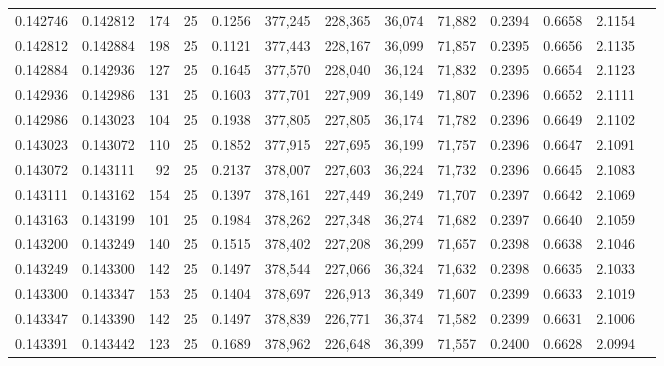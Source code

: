 \begin{tabular}{rrrrrrrrrrrrr}
0.142746 & 0.142812 &   174 &  25 &                                     0.1256 & 377,245 & 228,365 &  36,074 &  71,882 & 0.2394 & 0.6658 & 2.1154 \\
0.142812 & 0.142884 &   198 &  25 &                                     0.1121 & 377,443 & 228,167 &  36,099 &  71,857 & 0.2395 & 0.6656 & 2.1135 \\
0.142884 & 0.142936 &   127 &  25 &                                     0.1645 & 377,570 & 228,040 &  36,124 &  71,832 & 0.2395 & 0.6654 & 2.1123 \\
0.142936 & 0.142986 &   131 &  25 &                                     0.1603 & 377,701 & 227,909 &  36,149 &  71,807 & 0.2396 & 0.6652 & 2.1111 \\
0.142986 & 0.143023 &   104 &  25 &                                     0.1938 & 377,805 & 227,805 &  36,174 &  71,782 & 0.2396 & 0.6649 & 2.1102 \\
0.143023 & 0.143072 &   110 &  25 &                                     0.1852 & 377,915 & 227,695 &  36,199 &  71,757 & 0.2396 & 0.6647 & 2.1091 \\
0.143072 & 0.143111 &    92 &  25 &                                     0.2137 & 378,007 & 227,603 &  36,224 &  71,732 & 0.2396 & 0.6645 & 2.1083 \\
0.143111 & 0.143162 &   154 &  25 &                                     0.1397 & 378,161 & 227,449 &  36,249 &  71,707 & 0.2397 & 0.6642 & 2.1069 \\
0.143163 & 0.143199 &   101 &  25 &                                     0.1984 & 378,262 & 227,348 &  36,274 &  71,682 & 0.2397 & 0.6640 & 2.1059 \\
0.143200 & 0.143249 &   140 &  25 &                                     0.1515 & 378,402 & 227,208 &  36,299 &  71,657 & 0.2398 & 0.6638 & 2.1046 \\
0.143249 & 0.143300 &   142 &  25 &                                     0.1497 & 378,544 & 227,066 &  36,324 &  71,632 & 0.2398 & 0.6635 & 2.1033 \\
0.143300 & 0.143347 &   153 &  25 &                                     0.1404 & 378,697 & 226,913 &  36,349 &  71,607 & 0.2399 & 0.6633 & 2.1019 \\
0.143347 & 0.143390 &   142 &  25 &                                     0.1497 & 378,839 & 226,771 &  36,374 &  71,582 & 0.2399 & 0.6631 & 2.1006 \\
0.143391 & 0.143442 &   123 &  25 &                                     0.1689 & 378,962 & 226,648 &  36,399 &  71,557 & 0.2400 & 0.6628 & 2.0994 \\

\end{tabular}
